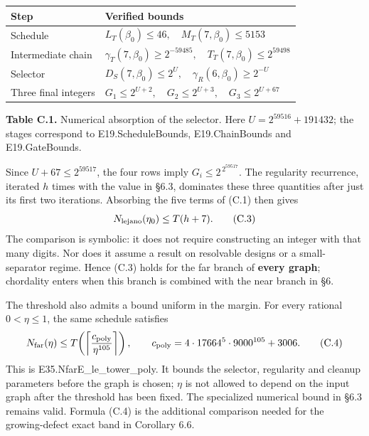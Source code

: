 \documentclass[english,11pt,a4paper]{article}
\newcounter{none}
\begin{document}

{\def\LTcaptype{none} %
\begin{longtable}[c]{@{}
  >{\raggedright\arraybackslash}p{}
  >{\raggedright\arraybackslash}p{}@{}}
\toprule\noalign{}
\begin{minipage}[b]{\linewidth}\raggedright
Step
\end{minipage} & \begin{minipage}[b]{\linewidth}\raggedright
Verified bounds
\end{minipage} \\
\midrule\noalign{}
\endhead
\bottomrule\noalign{}
\endlastfoot
Schedule & \(L_T(\beta_0)\le46,\quad M_T(7,\beta_0)\le5153\) \\
Intermediate chain & \(\gamma_T(7,\beta_0)\ge2^{-59485},\quad T_T(7,\beta_0)\le2^{59498}\) \\
Selector & \(D_S(7,\beta_0)\le2^U,\quad \gamma_R(6,\beta_0)\ge2^{-U}\) \\
Three final integers & \(G_1\le2^{U+2},\quad G_2\le2^{U+3},\quad G_3\le2^{U+67}\) \\
\end{longtable}
}

\textbf{Table C.1.} Numerical absorption of the selector. Here \(U=2^{59516}+191432\); the stages correspond to E19.ScheduleBounds, E19.ChainBounds and E19.GateBounds.

Since \(U+67\le2^{59517}\), the four rows imply \(G_i\le2^{\,2^{59517}}\). The regularity recurrence, iterated \(h\) times with the value in §6.3, dominates these three quantities after just its first two iterations. Absorbing the five terms of (C.1) then gives \[
N_{\rm lejano}(\eta_0)\le T(h+7).
\tag{C.3}
\] The comparison is symbolic: it does not require constructing an integer with that many digits. Nor does it assume a result on resolvable designs or a small-separator regime. Hence (C.3) holds for the far branch of \textbf{every graph}; chordality enters when this branch is combined with the near branch in §6.

The threshold also admits a bound uniform in the margin. For every rational \(0<\eta\le1\), the same schedule satisfies \[
N_{\rm far}(\eta)\le
T\!\left(\left\lceil\frac{c_{\rm poly}}{\eta^{105}}\right\rceil\right),
\qquad c_{\rm poly}=4\cdot17664^5\cdot9000^{105}+3006.
\tag{C.4}
\] This is {\ttfamily\small E35.\discretionary{\hbox{\ensuremath{\hookrightarrow}}}{}{}NfarE\_\discretionary{\hbox{\ensuremath{\hookrightarrow}}}{}{}le\_\discretionary{\hbox{\ensuremath{\hookrightarrow}}}{}{}tower\_\discretionary{\hbox{\ensuremath{\hookrightarrow}}}{}{}poly}. It bounds the selector, regularity and cleanup parameters before the graph is chosen; \(\eta\) is not allowed to depend on the input graph after the threshold has been fixed. The specialized numerical bound in §6.3 remains valid. Formula (C.4) is the additional comparison needed for the growing-defect exact band in Corollary 6.6.
\end{document}

